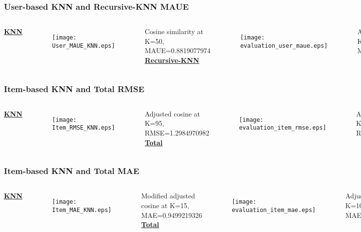 \begin{frame}[t]
    \frametitle{User-based KNN and Recursive-KNN MAUE}
    \vspace{-0.7cm}
    \begin{columns}
        \centering
        \underline{\textbf{KNN}}
    \begin{figure}
    \centering
    \texttt{[image: User\_MAUE\_KNN.eps]}
    \end{figure}
    \centering
    \tiny
    Cosine similarity at K=50, MAUE=0.8819077974
        \centering
        \underline{\textbf{Recursive-KNN}}
    \begin{figure}
    \centering
    \texttt{[image: evaluation\_user\_maue.eps]}
    \end{figure}
    \centering
    \tiny
    Adjusted cosine at K=75 \& M=20, MAUE=0.8558869566
\end{columns}
\end{frame}
\begin{frame}[t]
    \frametitle{Item-based KNN and Total RMSE}
    \vspace{-0.7cm}
    \begin{columns}
        \centering
        \underline{\textbf{KNN}}
    \begin{figure}
    \centering
    \texttt{[image: Item\_RMSE\_KNN.eps]}
    \end{figure}
    \centering
    \tiny
    Adjusted cosine at K=95, RMSE=1.2984970982
        \centering
        \underline{\textbf{Total}}
    \begin{figure}
    \centering
    \texttt{[image: evaluation\_item\_rmse.eps]}
    \end{figure}
    \centering
    \tiny
    Adjusted cosine at K=100 \& M=3, RMSE=1.3155259043
\end{columns}
\end{frame}
\begin{frame}[t]
    \frametitle{Item-based KNN and Total MAE}
        \vspace{-0.7cm}
        \begin{columns}
            \centering
            \underline{\textbf{KNN}}
        \begin{figure}
        \centering
        \texttt{[image: Item\_MAE\_KNN.eps]}
        \end{figure}
        \centering
        \tiny
        Modified adjusted cosine at K=15, MAE=0.9499219326
            \centering
            \underline{\textbf{Total}}
        \begin{figure}
        \centering
        \texttt{[image: evaluation\_item\_mae.eps]}
        \end{figure}
        \centering
        \tiny
        Adjusted cosine at K=100 \& M=3, MAE=0.9707211649
    \end{columns}
\end{frame}
